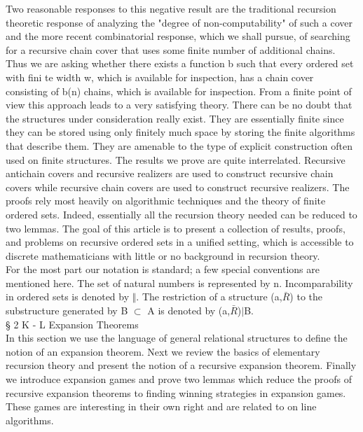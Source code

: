 \documentclass[twoside]{article}
\begin{document}
Two reasonable responses to this negative result are the traditional recursion theoretic response of analyzing the "degree of non-computability" of such a cover and the more recent combinatorial response, which we shall pursue, of searching for a recursive chain cover that uses some finite number of additional chains. 
Thus we are asking whether there exists a function b such that every ordered set with fini te width w, which is available for inspection, has a chain cover consisting of b(n) chains, which is available for inspection. 
From a finite point of view this approach leads to a very satisfying theory. 
There can be no doubt that the structures under consideration really exist. 
They are essentially finite since they can be stored using only finitely much space by storing the finite algorithms that describe them.    
They are amenable to the type of explicit construction often used on finite structures.    
The results we prove are quite interrelated. Recursive antichain covers and recursive realizers are used to construct recursive chain covers while recursive chain covers are used to construct recursive realizers.
The proofs rely most heavily on algorithmic techniques and the theory of finite ordered sets.    
Indeed, essentially all the recursion theory needed can be reduced to two lemmas. 
The goal of this article is to present a collection of results, proofs, and problems on recursive ordered sets in a unified setting, which is accessible to discrete mathematicians with little or no background in recursion theory.\\
\newline
For the most part our notation is standard; a few special conventions are mentioned here. The set of natural numbers is represented by n. 
Incomparability in ordered sets is denoted by $\Vert$. The restriction of a structure (a,$\bar{R}$) to the substructure generated by B $\subset$ A is denoted by (a,$\bar{R}$)$\vert$B.\\

\vspace{1cm}
\noindent \S \hspace{1pt} 2   K - L   Expansion Theorems\\


In this section we use the language of general relational structures to define the notion of an expansion theorem.   Next we review the basics of elementary recursion theory and present the notion of a recursive expansion theorem.    Finally we introduce expansion games and prove two lemmas which reduce the proofs of recursive expansion theorems to finding winning strategies in expansion games.   These games are interesting in their own right and are related to on line algorithms.
\end{document}
